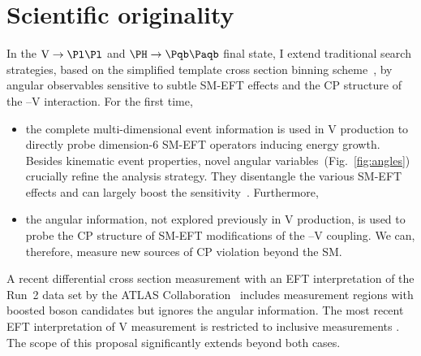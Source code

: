 \documentclass[a4paper,11pt]{article}
\newcommand{\Pb}{{{\Pqb}}\xspace}
\newcommand{\PAb}{{{{\Paqb}}}\xspace}
\renewcommand{\PV}{{{{V}}}\xspace}
\newcommand{\VH}{{{\PV}{\PH}}\xspace}
\begin{document}
\section{Scientific originality}

In the $\textrm{\PV}\rightarrow\Pl\Pl$ and $\PH\rightarrow\Pb\PAb$ final state, I extend traditional search strategies, based on the simplified template cross section binning scheme~\cite{Berger:2019wnu}, by angular observables sensitive to subtle SM-EFT effects and the CP structure of the \PH--\PV interaction. For the first time,

\begin{itemize}

\item the complete multi-dimensional event information is used in \VH production to directly probe dimension-6 SM-EFT operators inducing energy growth.
Besides kinematic event properties, novel angular variables~(Fig.~\ref{fig:angles}) crucially refine the analysis strategy. 
They disentangle the various SM-EFT effects and can largely boost the sensitivity~\cite{CMS-PAS-SMP-20-005}. Furthermore, 

\item the angular information, not explored previously in \VH production, is used to probe the CP structure of SM-EFT modifications of the \PH--\PV coupling. We can, therefore, measure new sources of CP violation beyond the SM.

\end{itemize}

A recent differential cross section measurement with an EFT interpretation of the Run~2 data set by the ATLAS Collaboration~\cite{ATLAS-CONF-2021-051} includes measurement regions with boosted \PH boson candidates but ignores the angular information. The most recent EFT interpretation of \VH measurement is restricted to inclusive measurements
\cite{CMS-PAS-HIG-19-005}. The scope of this proposal significantly extends beyond both cases.
\end{document}
